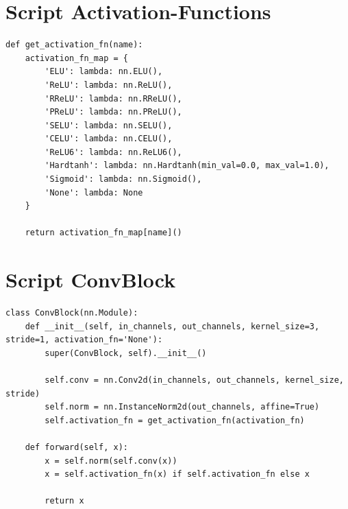 \section{Script Activation-Functions}
\label{sec:script_activation_functions}
\begin{longlisting}
\begin{verbatim}
def get_activation_fn(name):
    activation_fn_map = {
        'ELU': lambda: nn.ELU(),
        'ReLU': lambda: nn.ReLU(),
        'RReLU': lambda: nn.RReLU(),
        'PReLU': lambda: nn.PReLU(),
        'SELU': lambda: nn.SELU(),
        'CELU': lambda: nn.CELU(),
        'ReLU6': lambda: nn.ReLU6(),
        'Hardtanh': lambda: nn.Hardtanh(min_val=0.0, max_val=1.0),
        'Sigmoid': lambda: nn.Sigmoid(),
        'None': lambda: None
    }

    return activation_fn_map[name]()
\end{verbatim}
\label{lst:script_activation_functions}
\end{longlisting}

\section{Script ConvBlock}
\label{sec:script_conv_block}
\begin{longlisting}
\begin{verbatim}
class ConvBlock(nn.Module):
    def __init__(self, in_channels, out_channels, kernel_size=3, stride=1, activation_fn='None'):
        super(ConvBlock, self).__init__()

        self.conv = nn.Conv2d(in_channels, out_channels, kernel_size, stride)
        self.norm = nn.InstanceNorm2d(out_channels, affine=True)
        self.activation_fn = get_activation_fn(activation_fn)

    def forward(self, x):
        x = self.norm(self.conv(x))
        x = self.activation_fn(x) if self.activation_fn else x

        return x
\end{verbatim}
\label{lst:script_conv_block}
\end{longlisting}

